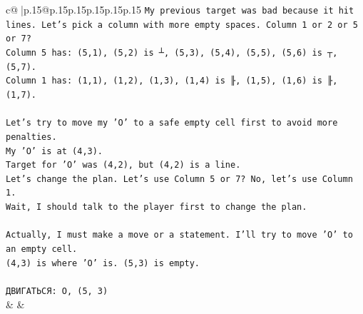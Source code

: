 \documentclass{article}
\begin{document}
{\begin{supertabular}{c@{$\;$}|p{.15\linewidth}@{}p{.15\linewidth}p{.15\linewidth}p{.15\linewidth}p{.15\linewidth}p{.15\linewidth}}
{{{\texttt{My previous target was bad because it hit lines. Let's pick a column with more empty spaces. Column 1 or 2 or 5 or 7?} \\
\texttt{Column 5 has: (5,1), (5,2) is ┴, (5,3), (5,4), (5,5), (5,6) is ┬, (5,7).} \\
\texttt{Column 1 has: (1,1), (1,2), (1,3), (1,4) is ╟, (1,5), (1,6) is ╟, (1,7).} \\
\\ 
\texttt{Let's try to move my 'O' to a safe empty cell first to avoid more penalties.} \\
\texttt{My 'O' is at (4,3).} \\
\texttt{Target for 'O' was (4,2), but (4,2) is a line.} \\
\texttt{Let's change the plan. Let's use Column 5 or 7? No, let's use Column 1.} \\
\texttt{Wait, I should talk to the player first to change the plan.} \\
\\ 
\texttt{Actually, I must make a move or a statement. I'll try to move 'O' to an empty cell.} \\
\texttt{(4,3) is where 'O' is. (5,3) is empty.} \\
\\ 
\texttt{ДВИГАТЬСЯ: O, (5, 3)} \\
            }
        }
    }
    & & \\ \\


\end{supertabular}}
\end{document}
